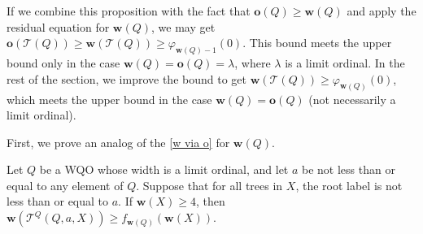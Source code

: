 \documentclass[runningheads]{llncs}
\let \geq \geqslant
\let \phi \varphi
\def \T {\mathcal{T}}
\def \o {\textbf{o}}
\def \w {\textbf{w}}
\begin{document}
If we combine this proposition with the fact that $\o(Q) \geq \w(Q)$ and apply the residual equation for $\w(Q)$, we may get $\o(\T(Q)) \geq \w(\T(Q)) \geq \phi_{\w(Q)-1}(0)$. This bound meets the upper bound only in the case $\w(Q) = \o(Q) = \lambda$, where $\lambda$ is a limit ordinal. In the rest of the section, we improve the bound to get $\w(\T(Q)) \geq \phi_{\w(Q)}(0)$, which meets the upper bound in the case $\w(Q) = \o(Q)$ (not necessarily a limit ordinal).

First, we prove an analog of the \cref{w via o} for $\w(Q)$.

\begin{lemma}
    Let $Q$ be a WQO whose width is a limit ordinal, and let $a$ be not less than or equal to any element of $Q$.
    Suppose that for all trees in $X$, the root label is not less than or equal to $a$.
    If $\w(X) \geq 4$, then $\w(\T^Q(Q, a, X)) \geq f_{\w(Q)}(\w(X))$.
\end{lemma}
\end{document}
